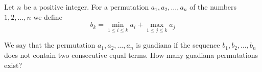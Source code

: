 Let $n$ be a positive integer. For a permutation $a_1, a_2, \dots, a_n$ of the numbers $1, 2, \dots, n$ we define$$b_k = \min_{1 \leq i \leq k} a_i + \max_{1 \leq j \leq k} a_j$$

We say that the permutation $a_1, a_2, \dots, a_n$ is guadiana if the sequence $b_1, b_2, \dots, b_n$ does not contain two consecutive equal terms. How many guadiana permutations exist?